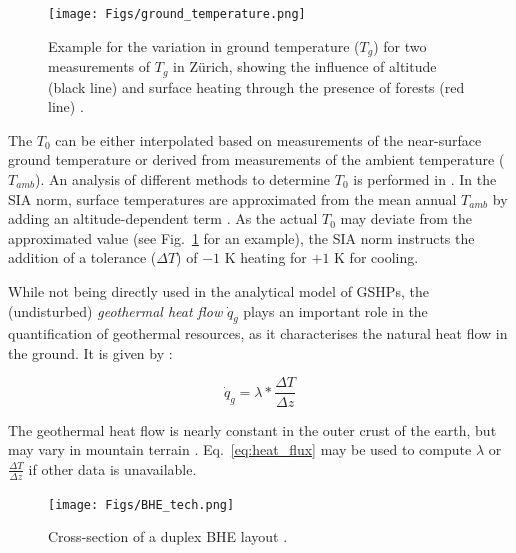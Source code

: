 \begin{figure}
    \centering
    \texttt{[image: Figs/ground\_temperature.png]}
    \caption[Example for the variation in ground temperature ($T_g$) for two measurements of $T_g$ in Zürich.]{Example for the variation in ground temperature ($T_g$) for two measurements of $T_g$ in Zürich, showing the influence of altitude (black line) and surface heating through the presence of forests (red line) \cite{huber_bodentemperaturen_2014}.}
    \label{fig:T_ground}
\end{figure}

The $T_0$ can be either interpolated based on measurements of the near-surface ground temperature \cite{assouline_machine_2019} or derived from measurements of the ambient temperature ($T_\mathit{amb}$). An analysis of different methods to determine $T_0$ is performed in \citep{signorelli_geoscientific_2004}. In the SIA norm, surface temperatures are  approximated from the mean annual $T_\mathit{amb}$ by adding an altitude-dependent term \cite{sia_sondes_2010}. As the actual $T_0$ may deviate from the approximated value (see Fig.~\ref{fig:T_ground} for an example), the SIA norm instructs the addition of a tolerance ($\Delta T$) of $- 1$ K heating for  $+1$ K for cooling.

While not being directly used in the analytical model of GSHPs, the (undisturbed) \textit{geothermal heat flow} $\dot{q}_{g}$ plays an important role in the quantification of geothermal resources, as it characterises the natural heat flow in the ground. It is given by \cite{huber_bodentemperaturen_2014}:

\begin{equation}
\label{eq:heat_flux}
    \dot{q}_{g} = \lambda * \frac{\Delta T}{\Delta z}
\end{equation}

The geothermal heat flow is nearly constant in the outer crust of the earth, but may vary in mountain terrain \citep{huber_bodentemperaturen_2014}. Eq.~\ref{eq:heat_flux} may be used to compute $\lambda$ or $ \frac{\Delta T}{\Delta z}$ if other data is unavailable.

\begin{figure}[tb]
    \centering
    \texttt{[image: Figs/BHE\_tech.png]}
    \caption[Cross-section of a duplex BHE layout.]{Cross-section of a duplex BHE layout \citep{pahud_geothermal_2002}.}
    \label{fig:BHE_cross-sec}
\end{figure}

